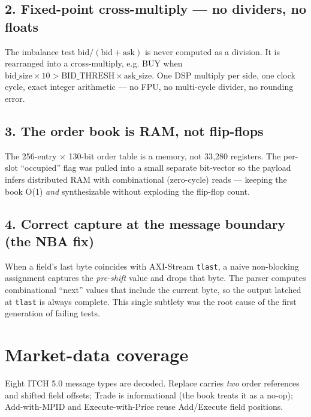 \documentclass[10pt,a4paper]{article}
\begin{document}
\subsection{2. Fixed-point cross-multiply --- no dividers, no floats}
The imbalance test $\text{bid}/(\text{bid}{+}\text{ask})$ is never computed as a division.
It is rearranged into a cross-multiply, e.g. BUY when
$\text{bid\_size}\times 10 > \text{BID\_THRESH}\times\text{ask\_size}$. One DSP multiply per
side, one clock cycle, exact integer arithmetic --- no FPU, no multi-cycle divider, no
rounding error.

\subsection{3. The order book is RAM, not flip-flops}
The 256-entry $\times$ 130-bit order table is a memory, not 33{,}280 registers. The
per-slot ``occupied'' flag was pulled into a small separate bit-vector so the payload
infers distributed RAM with combinational (zero-cycle) reads --- keeping the book O(1)
\emph{and} synthesizable without exploding the flip-flop count.

\subsection{4. Correct capture at the message boundary (the NBA fix)}
When a field's last byte coincides with AXI-Stream \texttt{tlast}, a naive non-blocking
assignment captures the \emph{pre-shift} value and drops that byte. The parser computes
combinational ``next'' values that include the current byte, so the output latched at
\texttt{tlast} is always complete. This single subtlety was the root cause of the first
generation of failing tests.

\section{Market-data coverage}

Eight ITCH 5.0 message types are decoded. Replace carries \emph{two} order references and
shifted field offsets; Trade is informational (the book treats it as a no-op); Add-with-MPID
and Execute-with-Price reuse Add/Execute field positions.
\end{document}
